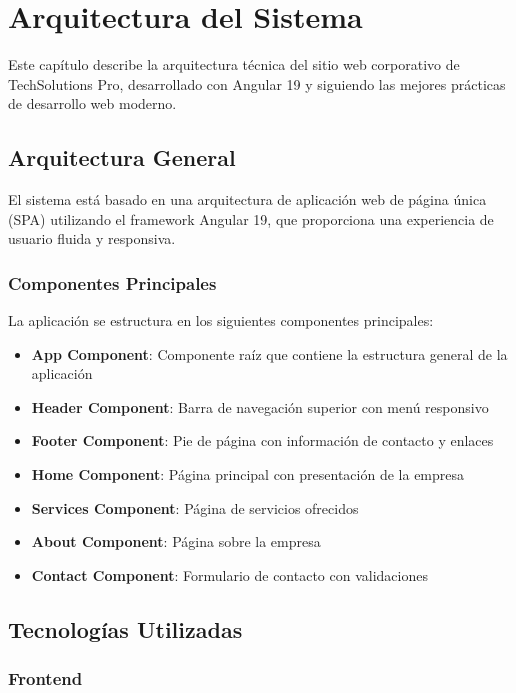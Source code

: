 \chapter{Arquitectura del Sistema}

Este capítulo describe la arquitectura técnica del sitio web corporativo de TechSolutions Pro, desarrollado con Angular 19 y siguiendo las mejores prácticas de desarrollo web moderno.

\section{Arquitectura General}

El sistema está basado en una arquitectura de aplicación web de página única (SPA) utilizando el framework Angular 19, que proporciona una experiencia de usuario fluida y responsiva.

\subsection{Componentes Principales}

La aplicación se estructura en los siguientes componentes principales:

\begin{itemize}
    \item \textbf{App Component}: Componente raíz que contiene la estructura general de la aplicación
    \item \textbf{Header Component}: Barra de navegación superior con menú responsivo
    \item \textbf{Footer Component}: Pie de página con información de contacto y enlaces
    \item \textbf{Home Component}: Página principal con presentación de la empresa
    \item \textbf{Services Component}: Página de servicios ofrecidos
    \item \textbf{About Component}: Página sobre la empresa
    \item \textbf{Contact Component}: Formulario de contacto con validaciones
\end{itemize}

\section{Tecnologías Utilizadas}

\subsection{Frontend}

